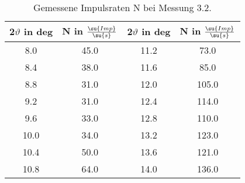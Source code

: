 \begin{table}
  \centering
  \caption{Gemessene Impulsraten N bei Messung 3.2.}
  \label{tab:Messung3.2}
  \begin{tabular}{c c | c c}
    \toprule
    2$\vartheta$ in deg & N in $\frac{\su{Imp}}{\su{s}}$ &
    2$\vartheta$ in deg & N in $\frac{\su{Imp}}{\su{s}}$  \\
    \midrule
     8.0 & 45.0 & 11.2 & 73.0  \\
     8.4 & 38.0 & 11.6 & 85.0  \\
     8.8 & 31.0 & 12.0 & 105.0 \\
     9.2 & 31.0 & 12.4 & 114.0 \\
     9.6 & 33.0 & 12.8 & 110.0 \\
    10.0 & 34.0 & 13.2 & 123.0 \\
    10.4 & 50.0 & 13.6 & 121.0 \\
    10.8 & 64.0 & 14.0 & 136.0 \\
    \bottomrule
  \end{tabular}
\end{table}

